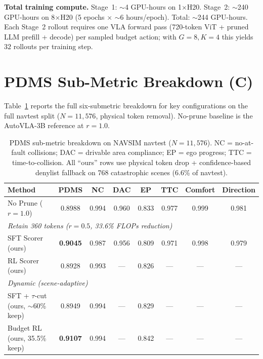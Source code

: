 \documentclass[letterpaper]{article}
\begin{document}
\textbf{Total training compute.} Stage~1: $\sim$4 GPU-hours on 1$\times$H20. Stage~2: $\sim$240
GPU-hours on 8$\times$H20 (5 epochs $\times$ $\sim$6 hours/epoch). Total: $\sim$244 GPU-hours. Each
Stage~2 rollout requires one VLA forward pass (720-token ViT + pruned LLM prefill + decode) per
sampled budget action; with $G{=}8, K{=}4$ this yields $32$ rollouts per training step.

\section{PDMS Sub-Metric Breakdown (C)}
\label{sec:submetrics}

Table~\ref{tab:submetrics} reports the full six-submetric breakdown for key configurations on the
full navtest split ($N{=}11{,}576$, physical token removal). No-prune baseline is the AutoVLA-3B
reference at $r{=}1.0$.

\begin{table}[h]
\centering
\caption{PDMS sub-metric breakdown on NAVSIM navtest ($N{=}11{,}576$). NC = no-at-fault collisions;
DAC = drivable area compliance; EP = ego progress; TTC = time-to-collision. All ``ours'' rows use
physical token drop + confidence-based denylist fallback on 768 catastrophic scenes (6.6\% of
navtest).}
\label{tab:submetrics}
\small
\begin{tabular}{@{}lccccccc@{}}
\toprule
Method & PDMS & NC & DAC & EP & TTC & Comfort & Direction \\
\midrule
No Prune ($r{=}1.0$) & 0.8988 & 0.994 & 0.960 & 0.833 & 0.977 & 0.999 & 0.981 \\
\midrule
\multicolumn{8}{l}{\emph{Retain 360 tokens ($r{=}0.5$, 33.6\% FLOPs reduction)}} \\
SFT Scorer (ours)  & \textbf{0.9045} & 0.987 & 0.956 & 0.809 & 0.971 & 0.998 & 0.979 \\
RL Scorer (ours)   & 0.8928 & 0.993 & --- & 0.826 & --- & --- & --- \\
\midrule
\multicolumn{8}{l}{\emph{Dynamic (scene-adaptive)}} \\
SFT + $\tau$-cut (ours, $\sim$60\% keep) & 0.8949 & 0.994 & --- & 0.829 & --- & --- & --- \\
Budget RL (ours, 35.5\% keep) & \textbf{0.9107} & 0.994 & --- & 0.842 & --- & --- & --- \\
\bottomrule
\end{tabular}
\end{table}
\end{document}
